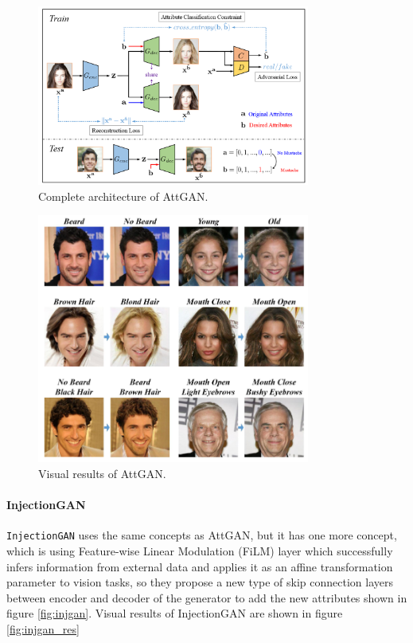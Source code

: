 \begin{figure}[H]
    \centering
    \includegraphics[width=0.8\textwidth]{images/attgan.png}
    \caption{Complete architecture of AttGAN.}
    \label{fig:attgan}
\end{figure}

\begin{figure}[H]
    \centering
    \includegraphics[width=0.8\textwidth]{images/attgan-results.png}
    \caption{Visual results of AttGAN.}
    \label{fig:attgan_res}
\end{figure}

\paragraph{InjectionGAN}
\texttt{InjectionGAN} \cite{9119402} uses the same concepts as AttGAN, but it has one more concept, which is using Feature-wise Linear Modulation (FiLM) layer which successfully infers information from external data and applies it as an affine transformation parameter to vision tasks, so they propose a new type of skip connection layers between encoder and decoder of the generator to add the new attributes shown in figure \ref{fig:injgan}. Visual results of InjectionGAN are shown in figure \ref{fig:injgan_res}

